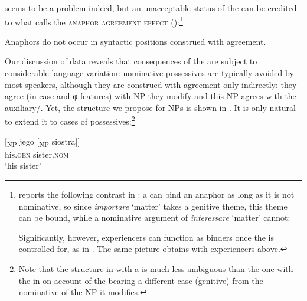 \documentclass[output=paper,nonflat,colorlinks,citecolor=brown,newtxmath]{langsci/langscibook}
\begin{document}
 seems to be a problem indeed, but an unacceptable status of the  can be credited to what \cite[26]{rizzi1990} calls the \textsc{anaphor agreement effect} ():\footnote{\cite[32--33]{rizzi1990} reports the following contrast in : a   can bind an anaphor as long as it is not nominative, so since \textit{importare} ‘matter’ takes a genitive theme, this theme can be bound, while a nominative argument of \textit{interessare} ‘matter’ cannot:

\z

\z

\noindent Significantly, however,  experiencers can function as binders once the  is controlled for, as in . The same picture obtains with   experiencers above.}

\ea \label{ex:witkos:53}
Anaphors do not occur in syntactic positions construed with agreement.\\
\z


Our discussion of  data reveals that consequences of the  are subject to considerable language variation: nominative  possessives are typically avoided by most speakers, although they are construed with agreement only indirectly: they agree (in case and φ-features) with NP they modify and this NP agrees with the auxiliary/. Yet, the structure we propose for   NPs is shown in . It is only natural to extend it to cases of  possessives:\footnote{\label{fn29}Note that the structure in  with a   is much less ambiguous than the one with the  in  on account of the   bearing a different case (genitive) from the nominative of the NP it modifies.}

\ea \label{ex:witkos:57}{
\gll $[$\textsubscript{NP} jego [\textsubscript{NP}  siostra$]]$\\
     {} his.\textsc{gen} {} sister.\textsc{nom}\\
\glt `his sister'
}
\z
\end{document}
